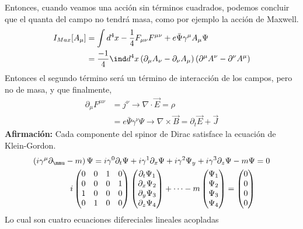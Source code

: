 \documentclass[../main.tex]{subfiles}
\begin{document}
Entonces, cuando veamos una acción sin términos cuadrados, podemos concluir que el quanta del campo no tendrá masa, como por ejemplo la acción de Maxwell.
\begin{align*}
  I_{Max} [A_\mu] & = \int d^4x - \frac{1}{4}F_{\mu \nu}F^{\mu \nu} + e \bar{\Psi}\gamma^\mu A_\mu \Psi \\
  & = \frac{-1}{4}\ind d^4 x \left( \partial_\mu A_\nu - \partial_\nu A_\mu \right) \left( \partial^\mu A^\nu - \partial^\nu A^\mu \right) 
 \end{align*}
 Entonces el segundo término será un término de interacción de los campos, pero no de masa, y que finalmente,
 \begin{align*}
   \partial_\mu F^{\mu \nu} & = j^\nu \rightarrow \nabla \cdot \vec{E} = \rho \\
   & = e\bar{\Psi}\gamma^\nu \Psi \rightarrow \nabla \times \vec{B} = \partial_t\vec{E} + \vec{J}
 \end{align*}
 \textbf{Afirmación:} Cada componente del spinor de Dirac satisface la ecuación de Klein-Gordon.
 \begin{align*}
   \left( i\gamma^\mu \partial_\mmu - m \right)\Psi = i\gamma^0 \partial_t\Psi +i\gamma^1 \partial_x\Psi + i\gamma^2\Psi_y + i\gamma^3\partial_z \Psi - m \Psi & = 0\\
   i \begin{pmatrix}
     0 & 0 & 1 & 0 \\ 0 & 0 & 0 & 1 \\ 1 & 0 & 0 & 0 \\ 0 & 1 & 0 & 0
   \end{pmatrix}
   \begin{pmatrix}
     \partial_t \Psi_1 \\ \partial_x \Psi_2 \\ \partial_y \Psi_3 \\ \partial_z \Psi_4
   \end{pmatrix} + \dots - m \begin{pmatrix}
     \Psi_1 \\ \Psi_2 \\ \Psi_3 \\ \Psi_4
   \end{pmatrix} = \begin{pmatrix}
     0 \\ 0 \\ 0 \\ 0
   \end{pmatrix}
 \end{align*}
 Lo cual son cuatro ecuaciones difereciales lineales acopladas
\end{document}
